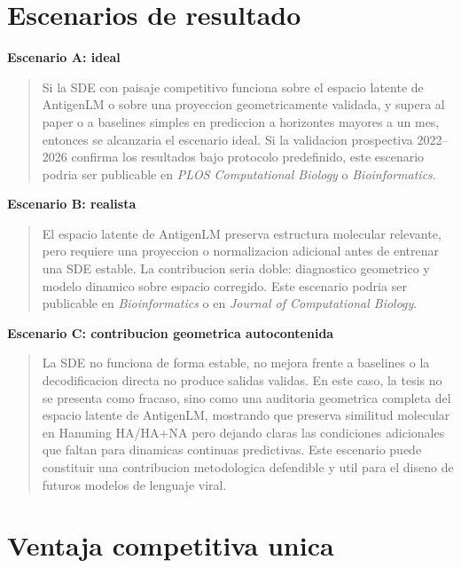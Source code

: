 \documentclass[12pt,letterpaper]{article}
\newenvironment{escenario}[1]{%
    \vspace{0.5em}
    \noindent\textbf{#1}\par\smallskip
    \begin{quote}
}{%
    \end{quote}
}
\begin{document}
\section{Escenarios de resultado}

\begin{escenario}{Escenario A: ideal}
Si la SDE con paisaje competitivo funciona sobre el espacio latente de AntigenLM o sobre una proyeccion geometricamente validada, y supera al paper o a baselines simples en prediccion a horizontes mayores a un mes, entonces se alcanzaria el escenario ideal. Si la validacion prospectiva 2022--2026 confirma los resultados bajo protocolo predefinido, este escenario podria ser publicable en \emph{PLOS Computational Biology} o \emph{Bioinformatics}.
\end{escenario}

\begin{escenario}{Escenario B: realista}
El espacio latente de AntigenLM preserva estructura molecular relevante, pero requiere una proyeccion o normalizacion adicional antes de entrenar una SDE estable. La contribucion seria doble: diagnostico geometrico y modelo dinamico sobre espacio corregido. Este escenario podria ser publicable en \emph{Bioinformatics} o en \emph{Journal of Computational Biology}.
\end{escenario}

\begin{escenario}{Escenario C: contribucion geometrica autocontenida}
La SDE no funciona de forma estable, no mejora frente a baselines o la decodificacion directa no produce salidas validas. En este caso, la tesis no se presenta como fracaso, sino como una auditoria geometrica completa del espacio latente de AntigenLM, mostrando que preserva similitud molecular en Hamming HA/HA+NA pero dejando claras las condiciones adicionales que faltan para dinamicas continuas predictivas. Este escenario puede constituir una contribucion metodologica defendible y util para el diseno de futuros modelos de lenguaje viral.
\end{escenario}

\section{Ventaja competitiva unica}
\end{document}
